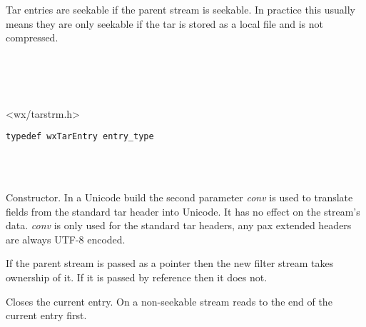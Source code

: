 Tar entries are seekable if the parent stream is seekable. In practice this
usually means they are only seekable if the tar is stored as a local file and
is not compressed.


\\
\\
\\


<wx/tarstrm.h>



\begin{verbatim}
typedef wxTarEntry entry_type
\end{verbatim}

\\
\\



\label{wxtarinputstreamwxtarinputstream}



Constructor. In a Unicode build the second parameter {\it conv} is
used to translate fields from the standard tar header into Unicode. It has
no effect on the stream's data. {\it conv} is only used for the standard
tar headers, any pax extended headers are always UTF-8 encoded.

If the parent stream is passed as a pointer then the new filter stream
takes ownership of it. If it is passed by reference then it does not.


\label{wxtarinputstreamcloseentry}


Closes the current entry. On a non-seekable stream reads to the end of
the current entry first.


